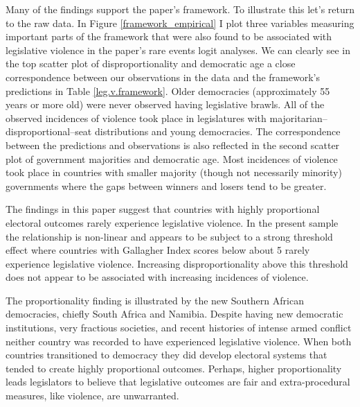 \documentclass[a4paper]{article}\usepackage{graphicx, color}
\begin{document}
Many of the findings support the paper's framework. To illustrate this let's return to the raw data. In Figure \ref{framework_empirical} I plot three variables measuring important parts of the framework that were also found to be associated with legislative violence in the paper's rare events logit analyses. We can clearly see in the top scatter plot of disproportionality and democratic age a close correspondence between our observations in the data and the framework's predictions in Table \ref{leg.v.framework}. Older democracies (approximately 55 years or more old) were never observed having legislative brawls. All of the observed incidences of violence took place in legislatures with majoritarian--disproportional--seat distributions and young democracies. The correspondence between the predictions and observations is also reflected in the second scatter plot of government majorities and democratic age. Most incidences of violence took place in countries with smaller majority (though not necessarily minority) governments where the gaps between winners and losers tend to be greater.

The findings in this paper suggest that countries with highly proportional electoral outcomes rarely experience legislative violence. In the present sample the relationship is non-linear and appears to be subject to a strong threshold effect where countries with Gallagher Index scores below about 5 rarely experience legislative violence. Increasing disproportionality above this threshold does not appear to be associated with increasing incidences of violence.

The proportionality finding is illustrated by the new Southern African democracies, chiefly South Africa and Namibia. Despite having new democratic institutions, very fractious societies, and recent histories of intense armed conflict neither country was recorded to have experienced legislative violence. When both countries transitioned to democracy they did develop electoral systems that tended to create highly proportional outcomes. Perhaps, higher proportionality leads legislators to believe that legislative outcomes are fair and extra-procedural measures, like violence, are unwarranted.    
\end{document}
